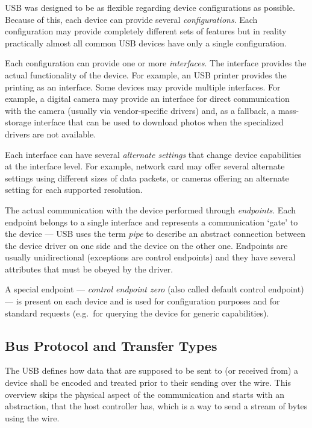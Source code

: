 USB was designed to be as flexible regarding device configurations as possible.
Because of this, each device can provide several \textit{configurations}. Each
configuration may provide completely different sets of features but in reality
practically almost all common USB devices have only a single configuration.

Each configuration can provide one or more \textit{interfaces}. The interface
provides the actual functionality of the device. For example, an USB printer
provides the printing as an interface. Some devices may provide multiple
interfaces. For example, a digital camera may provide an interface for direct
communication with the camera (usually via vendor-specific drivers) and, as a
fallback, a mass-storage interface that can be used to download photos when the
specialized drivers are not available.

Each interface can have several \textit{alternate settings} that change device
capabilities at the interface level. For example, network card may offer
several alternate settings using different sizes of data packets, or cameras
offering an alternate setting for each supported resolution.

The actual communication with the device performed through \textit{endpoints}.
Each endpoint belongs to a single interface and represents a communication
‘gate’ to the device — USB uses the term \textit{pipe} to describe an abstract
connection between the device driver on one side and the device on the other
one. Endpoints are usually unidirectional (exceptions are control endpoints)
and they have several attributes that must be obeyed by the driver.

A special endpoint — \textit{control endpoint zero} (also called default
control endpoint) — is present on each device and is used for configuration
purposes and for standard requests (e.g.\ for querying the device for
generic capabilities).

\subsection{Bus Protocol and Transfer Types}

The USB defines how data that are supposed to be sent to (or received from) a
device shall be encoded and treated prior to their sending over the wire. This
overview skips the physical aspect of the communication and starts with an
abstraction, that the host controller has, which is a way to send a stream of
bytes using the wire.

